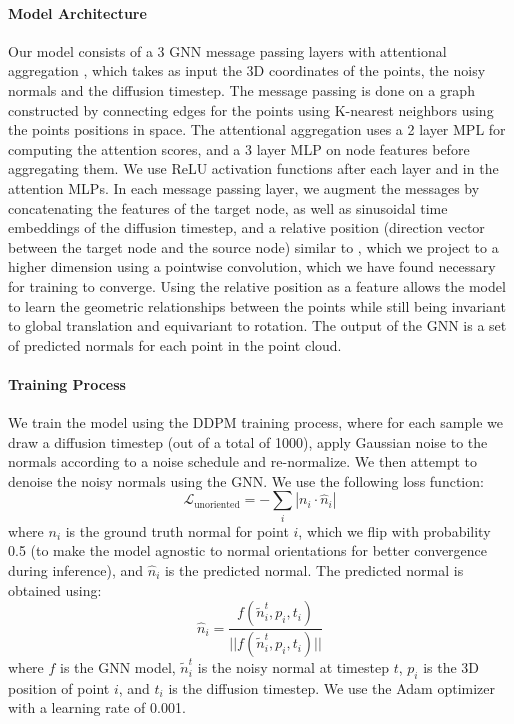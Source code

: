 \documentclass{acmart}
\begin{document}
\paragraph{Model Architecture}
Our model consists of a 3 GNN message passing layers with attentional aggregation \cite{li2019graph}, which takes as input the 3D coordinates of the points, the noisy normals and the diffusion timestep. The message passing is done on a graph constructed by connecting edges for the points using K-nearest neighbors using the points positions in space. The attentional aggregation uses a 2 layer MPL for computing the attention scores, and a 3 layer MLP on node features before aggregating them. We use ReLU activation functions after each layer and in the attention MLPs. In each message passing layer, we augment the messages by concatenating the features of the target node, as well as sinusoidal time embeddings of the diffusion timestep, and a relative position (direction vector between the target node and the source node) similar to \cite{qi2017pointnet++}, which we project to a higher dimension using a pointwise convolution, which we have found necessary for training to converge. Using the relative position as a feature allows the model to learn the geometric relationships between the points while still being invariant to global translation and equivariant to rotation. The output of the GNN is a set of predicted normals for each point in the point cloud.


\paragraph{Training Process}
We train the model using the DDPM training process, where for each sample we draw a diffusion timestep (out of a total of 1000), apply Gaussian noise to the normals according to a noise schedule and re-normalize. We then attempt to denoise the noisy normals using the GNN. We use the following loss function:
\begin{equation}
  \mathcal{L}_{\text{unoriented}} = -\sum_i \left|n_i \cdot \hat{n}_i\right|  
\end{equation}
where $n_i$ is the ground truth normal for point $i$, which we flip with probability 0.5 (to make the model agnostic to normal orientations for better convergence during inference), and $\hat{n}_i$ is the predicted normal. The predicted normal is obtained using:
\begin{equation}
    \hat{n}_i = \frac{f(\tilde{n}_i^t, p_i, t_i)}{||f(\tilde{n}_i^t, p_i, t_i)||}
\end{equation}
where $f$ is the GNN model, $\tilde{n}_i^t$ is the noisy normal at timestep $t$, $p_i$ is the 3D position of point $i$, and $t_i$ is the diffusion timestep. We use the Adam optimizer with a learning rate of 0.001.
\end{document}
